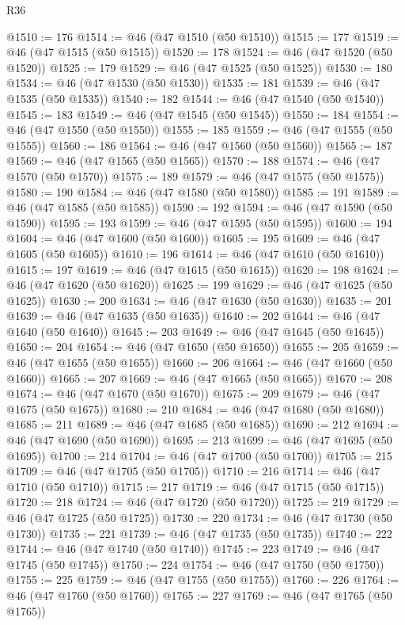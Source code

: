 \begin{lexlean}{R36}
\begin{coremodule}
@1510 := 176
@1514 := @46 (@47 @1510 (@50 @1510))
@1515 := 177
@1519 := @46 (@47 @1515 (@50 @1515))
@1520 := 178
@1524 := @46 (@47 @1520 (@50 @1520))
@1525 := 179
@1529 := @46 (@47 @1525 (@50 @1525))
@1530 := 180
@1534 := @46 (@47 @1530 (@50 @1530))
@1535 := 181
@1539 := @46 (@47 @1535 (@50 @1535))
@1540 := 182
@1544 := @46 (@47 @1540 (@50 @1540))
@1545 := 183
@1549 := @46 (@47 @1545 (@50 @1545))
@1550 := 184
@1554 := @46 (@47 @1550 (@50 @1550))
@1555 := 185
@1559 := @46 (@47 @1555 (@50 @1555))
@1560 := 186
@1564 := @46 (@47 @1560 (@50 @1560))
@1565 := 187
@1569 := @46 (@47 @1565 (@50 @1565))
@1570 := 188
@1574 := @46 (@47 @1570 (@50 @1570))
@1575 := 189
@1579 := @46 (@47 @1575 (@50 @1575))
@1580 := 190
@1584 := @46 (@47 @1580 (@50 @1580))
@1585 := 191
@1589 := @46 (@47 @1585 (@50 @1585))
@1590 := 192
@1594 := @46 (@47 @1590 (@50 @1590))
@1595 := 193
@1599 := @46 (@47 @1595 (@50 @1595))
@1600 := 194
@1604 := @46 (@47 @1600 (@50 @1600))
@1605 := 195
@1609 := @46 (@47 @1605 (@50 @1605))
@1610 := 196
@1614 := @46 (@47 @1610 (@50 @1610))
@1615 := 197
@1619 := @46 (@47 @1615 (@50 @1615))
@1620 := 198
@1624 := @46 (@47 @1620 (@50 @1620))
@1625 := 199
@1629 := @46 (@47 @1625 (@50 @1625))
@1630 := 200
@1634 := @46 (@47 @1630 (@50 @1630))
@1635 := 201
@1639 := @46 (@47 @1635 (@50 @1635))
@1640 := 202
@1644 := @46 (@47 @1640 (@50 @1640))
@1645 := 203
@1649 := @46 (@47 @1645 (@50 @1645))
@1650 := 204
@1654 := @46 (@47 @1650 (@50 @1650))
@1655 := 205
@1659 := @46 (@47 @1655 (@50 @1655))
@1660 := 206
@1664 := @46 (@47 @1660 (@50 @1660))
@1665 := 207
@1669 := @46 (@47 @1665 (@50 @1665))
@1670 := 208
@1674 := @46 (@47 @1670 (@50 @1670))
@1675 := 209
@1679 := @46 (@47 @1675 (@50 @1675))
@1680 := 210
@1684 := @46 (@47 @1680 (@50 @1680))
@1685 := 211
@1689 := @46 (@47 @1685 (@50 @1685))
@1690 := 212
@1694 := @46 (@47 @1690 (@50 @1690))
@1695 := 213
@1699 := @46 (@47 @1695 (@50 @1695))
@1700 := 214
@1704 := @46 (@47 @1700 (@50 @1700))
@1705 := 215
@1709 := @46 (@47 @1705 (@50 @1705))
@1710 := 216
@1714 := @46 (@47 @1710 (@50 @1710))
@1715 := 217
@1719 := @46 (@47 @1715 (@50 @1715))
@1720 := 218
@1724 := @46 (@47 @1720 (@50 @1720))
@1725 := 219
@1729 := @46 (@47 @1725 (@50 @1725))
@1730 := 220
@1734 := @46 (@47 @1730 (@50 @1730))
@1735 := 221
@1739 := @46 (@47 @1735 (@50 @1735))
@1740 := 222
@1744 := @46 (@47 @1740 (@50 @1740))
@1745 := 223
@1749 := @46 (@47 @1745 (@50 @1745))
@1750 := 224
@1754 := @46 (@47 @1750 (@50 @1750))
@1755 := 225
@1759 := @46 (@47 @1755 (@50 @1755))
@1760 := 226
@1764 := @46 (@47 @1760 (@50 @1760))
@1765 := 227
@1769 := @46 (@47 @1765 (@50 @1765))

\end{coremodule}
\end{lexlean}
